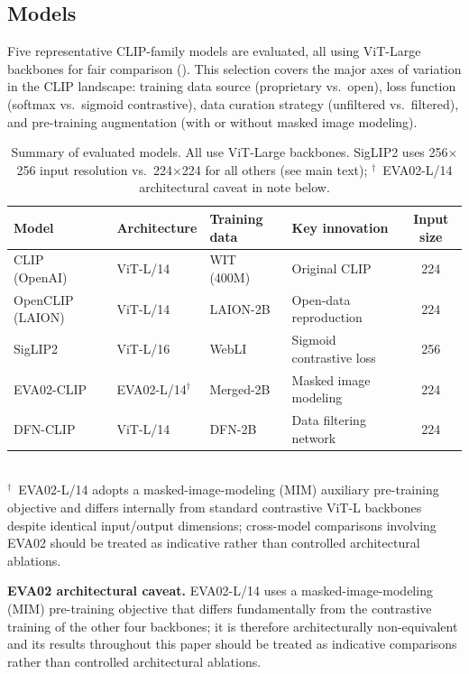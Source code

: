 \documentclass[symmetry,article,submit,pdftex,moreauthors]{Definitions/mdpi}
\begin{document}
\subsection{Models}
\label{sec:models}

Five representative CLIP-family models are evaluated, all using ViT-Large backbones for fair comparison ().
This selection covers the major axes of variation in the CLIP landscape: training data source (proprietary vs.\ open), loss function (softmax vs.\ sigmoid contrastive), data curation strategy (unfiltered vs.\ filtered), and pre-training augmentation (with or without masked image modeling).

\begin{table}[H]
\caption{Summary of evaluated models. All use ViT-Large backbones. SigLIP2 uses 256$\times$256 input resolution vs.\ 224$\times$224 for all others (see main text); $^{\dagger}$~EVA02-L/14 architectural caveat in note below.}
\label{tab:models}
\centering
\small
\setlength{\tabcolsep}{4pt}
\begin{tabular}{llllc}
\toprule
\textbf{Model} & \textbf{Architecture} & \textbf{Training data} & \textbf{Key innovation} & \textbf{Input size} \\
\midrule
CLIP (OpenAI)~\cite{radford2021learning} & ViT-L/14 & WIT (400M) & Original CLIP & 224 \\
OpenCLIP (LAION)~\cite{cherti2023reproducible} & ViT-L/14 & LAION-2B & Open-data reproduction & 224 \\
SigLIP2~\cite{tschannen2025siglip2} & ViT-L/16 & WebLI & Sigmoid contrastive loss & 256 \\
EVA02-CLIP~\cite{sun2023eva02} & EVA02-L/14$^{\dagger}$ & Merged-2B & Masked image modeling & 224 \\
DFN-CLIP~\cite{fang2023data} & ViT-L/14 & DFN-2B & Data filtering network & 224 \\
\bottomrule
\end{tabular}
\\[3pt]
{\footnotesize $^{\dagger}$~EVA02-L/14 adopts a masked-image-modeling (MIM) auxiliary pre-training objective and differs internally from standard contrastive ViT-L backbones despite identical input/output dimensions; cross-model comparisons involving EVA02 should be treated as indicative rather than controlled architectural ablations.}
\end{table}

\textbf{EVA02 architectural caveat.} EVA02-L/14 uses a masked-image-modeling (MIM) pre-training objective that differs fundamentally from the contrastive training of the other four backbones; it is therefore architecturally non-equivalent and its results throughout this paper should be treated as indicative comparisons rather than controlled architectural ablations.
\end{document}

